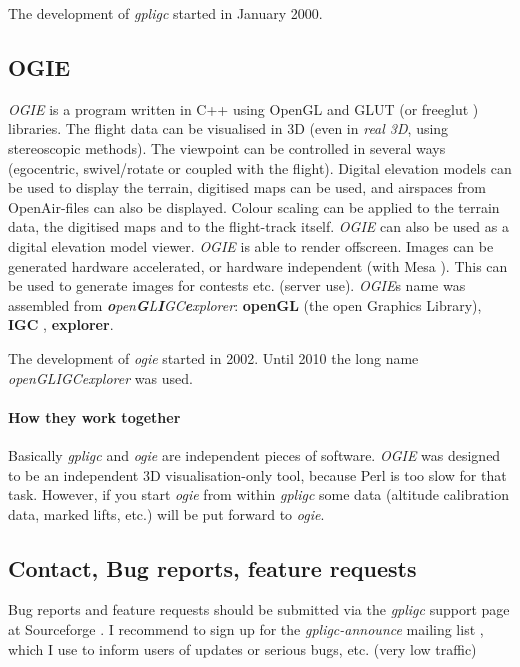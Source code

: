 The development of \emph{gpligc} started in January 2000.


\subsection{OGIE}
\emph{OGIE} is a  program written in C++ using OpenGL and GLUT (or freeglut \cite{freeglut}) libraries.
The flight data can be visualised in 3D (even in \emph{real 3D}, using stereoscopic methods).
The viewpoint can be controlled in several  ways (egocentric, swivel/rotate or coupled with the flight).
Digital elevation models can be used to display the terrain, digitised maps can be used, and airspaces from OpenAir\texttrademark-files can also be displayed.
Colour scaling can be applied to the terrain data, the digitised maps and to the flight-track itself.
\emph{OGIE} can also be used as a digital elevation model viewer.
\emph{OGIE} is able to render offscreen. Images can be generated hardware accelerated, or hardware independent (with Mesa \cite{mesa}). This can be used to generate images for contests etc. (server use).
\emph{OGIE}s name was assembled from \emph{\textbf{o}pen\textbf{G}L\textbf{I}GC\textbf{e}xplorer}: \textbf{openGL} (the open Graphics Library), \textbf{IGC} \cite{igc}, \textbf{explorer}.


The development of \emph{ogie} started in 2002. Until 2010 the long name \emph{openGLIGCexplorer} was used.


\paragraph{How they work together}
Basically \emph{gpligc} and \emph{ogie} are independent pieces of software.
\emph{OGIE} was designed to be an independent 3D visualisation-only tool, because Perl is too slow for that task.
However, if you start \emph{ogie} from within \emph{gpligc} some data (altitude calibration data, marked lifts, etc.) will be put forward to \emph{ogie}.

\subsection{Contact, Bug reports, feature requests}
Bug reports and feature requests should be submitted via the \emph{gpligc} support page at Sourceforge \cite{gpligc}.
I recommend to sign up for the \emph{gpligc-announce} mailing list \cite{gpligc}, which I use to inform users of updates or serious bugs, etc. (very low traffic)





